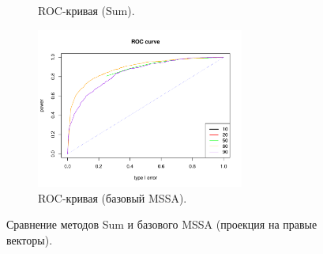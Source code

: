 \documentclass[specialist,
substylefile = spbu_report.rtx,
subf,href,colorlinks=true, 12pt]{disser}
\theoremstyle{definition}
\begin{document}
\begin{figure}
\begin{subfigure}[t]{0.45\textwidth}
			\caption{ROC-кривая (Sum).}
		\end{subfigure}\hspace{\fill}
		\begin{subfigure}[t]{0.45\textwidth}
			\centering
			\includegraphics[width=0.75\textwidth]{roc_mssa_fa.pdf}
			\caption{ROC-кривая (базовый MSSA).}
		\end{subfigure}
		\caption{Сравнение методов Sum и базового MSSA (проекция на правые векторы).}
		\label{fig:sum_fa}
	\end{figure}
\end{document}

